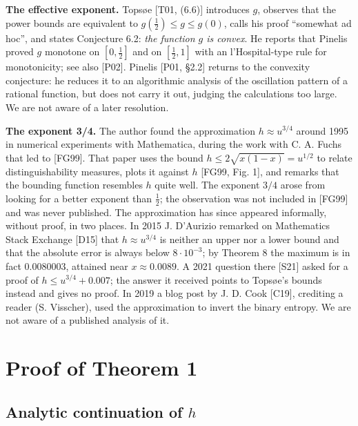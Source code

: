 \documentclass[
  11pt,
]{article}
\begin{document}
\textbf{The effective exponent.} Topsøe {[}T01, (6.6){]} introduces
\(g\), observes that the power bounds are equivalent to
\(g(\tfrac12) \le g \le g(0)\), calls his proof ``somewhat ad hoc'', and
states Conjecture 6.2: \emph{the function \(g\) is convex}. He reports
that Pinelis proved \(g\) monotone on \([0,\tfrac12]\) and on
\([\tfrac12,1]\) with an l'Hospital-type rule for monotonicity; see also
{[}P02{]}. Pinelis {[}P01, §2.2{]} returns to the convexity conjecture:
he reduces it to an algorithmic analysis of the oscillation pattern of a
rational function, but does not carry it out, judging the calculations
too large. We are not aware of a later resolution.

\textbf{The exponent 3/4.} The author found the approximation
\(h \approx u^{3/4}\) around 1995 in numerical experiments with
Mathematica, during the work with C. A. Fuchs that led to {[}FG99{]}.
That paper uses the bound \(h \le 2\sqrt{x(1-x)} = u^{1/2}\) to relate
distinguishability measures, plots it against \(h\) {[}FG99, Fig. 1{]},
and remarks that the bounding function resembles \(h\) quite well. The
exponent \(3/4\) arose from looking for a better exponent than
\(\tfrac12\); the observation was not included in {[}FG99{]} and was
never published. The approximation has since appeared informally,
without proof, in two places. In 2015 J. D'Aurizio remarked on
Mathematics Stack Exchange {[}D15{]} that \(h \approx u^{3/4}\) is
neither an upper nor a lower bound and that the absolute error is always
below \(8\cdot10^{-3}\); by Theorem 8 the maximum is in fact
\(0.0080003\), attained near \(x \approx 0.0089\). A 2021 question there
{[}S21{]} asked for a proof of \(h \le u^{3/4} + 0.007\); the answer it
received points to Topsøe's bounds instead and gives no proof. In 2019 a
blog post by J. D. Cook {[}C19{]}, crediting a reader (S. Visscher),
used the approximation to invert the binary entropy. We are not aware of
a published analysis of it.

\hypertarget{proof-of-theorem-1}{%
\section{Proof of Theorem 1}\label{proof-of-theorem-1}}

\hypertarget{analytic-continuation-of-h}{%
\subsection{\texorpdfstring{Analytic continuation of
\(h\)}{Analytic continuation of h}}\label{analytic-continuation-of-h}}
\end{document}
